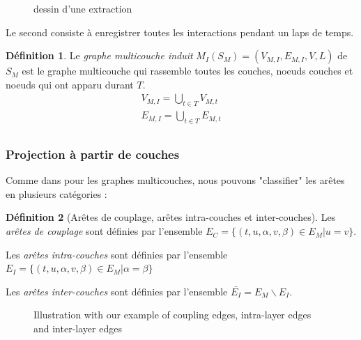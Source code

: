 \documentclass[11pt,a4paper]{article}
\theoremstyle{definition}
\newtheorem{defn}{Définition}
\theoremstyle{remark}
\theoremstyle{remark}
\begin{document}
	\begin{figure}[h]
		\begin{minipage}{0.49\linewidth}
		\end{minipage}
		\begin{minipage}{0.49\linewidth}
		\end{minipage}
		\caption{dessin d'une extraction}
	\end{figure}

    Le second consiste à \og enregistrer \fg{} toutes les interactions pendant un laps de temps.
    \begin{defn}
    Le {\em graphe multicouche induit} $M_I(S_M) = (V_{M,I}, E_{M,I}, V,L)$ de $S_M$ est le graphe multicouche qui rassemble toutes les couches, noeuds couches et noeuds qui ont apparu durant $T$.
    \begin{align*}
    	V_{M,I} = \bigcup_{t\in T} V_{M,t}\\
    	E_{M,I} = \bigcup_{t\in T} E_{M,t}\\
    \end{align*}
    \end{defn}
	


\subsubsection{Projection à partir de couches}
Comme dans \cite{mlkiv} pour les graphes multicouches, nous pouvons "classifier" les arêtes en plusieurs catégories :
	
	\begin{defn}[Arêtes de couplage, arêtes intra-couches et inter-couches]

   	Les {\em arêtes de couplage} sont définies par l'ensemble $E_C=\{(t,u,\alpha,v,\beta)\in E_M | u=v\}$.

    Les {\em arêtes intra-couches} sont définies par l'ensemble $E_I = \{(t,u,\alpha,v,\beta) \in E_M | \alpha = \beta \}$

    Les {\em arêtes inter-couches} sont définies par l'ensemble $\bar{E_I} = E_M\backslash E_I$.
    
	
	\end{defn}	
	
	\begin{figure}[h]
		\centering
		\caption{Illustration with our example of coupling edges, intra-layer edges and inter-layer edges}
		\label{exIntraInter}
	\end{figure}
	
\end{document}
